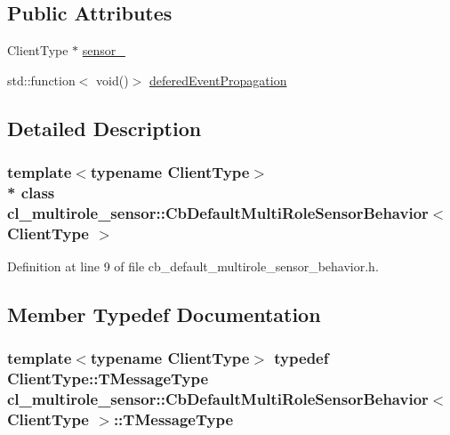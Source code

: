 \subsection*{Public Attributes}
\begin{DoxyCompactItemize}
\item 
Client\+Type $\ast$ \hyperlink{classcl__multirole__sensor_1_1CbDefaultMultiRoleSensorBehavior_a201893c3c859259eac3166405f3509cb}{sensor\+\_\+}
\item 
std\+::function$<$ void()$>$ \hyperlink{classcl__multirole__sensor_1_1CbDefaultMultiRoleSensorBehavior_a18f86fd2fd9c3575b62a2c58953b7d33}{defered\+Event\+Propagation}
\end{DoxyCompactItemize}


\subsection{Detailed Description}
\subsubsection*{template$<$typename Client\+Type$>$\\*
class cl\+\_\+multirole\+\_\+sensor\+::\+Cb\+Default\+Multi\+Role\+Sensor\+Behavior$<$ Client\+Type $>$}



Definition at line 9 of file cb\+\_\+default\+\_\+multirole\+\_\+sensor\+\_\+behavior.\+h.



\subsection{Member Typedef Documentation}
\subsubsection[{\texorpdfstring{T\+Message\+Type}{TMessageType}}]{\setlength{\rightskip}{0pt plus 5cm}template$<$typename Client\+Type$>$ typedef Client\+Type\+::\+T\+Message\+Type {\bf cl\+\_\+multirole\+\_\+sensor\+::\+Cb\+Default\+Multi\+Role\+Sensor\+Behavior}$<$ Client\+Type $>$\+::{\bf T\+Message\+Type}}\hypertarget{classcl__multirole__sensor_1_1CbDefaultMultiRoleSensorBehavior_aa23bc8c99de1eddad01d094bdab62aa4}{}\label{classcl__multirole__sensor_1_1CbDefaultMultiRoleSensorBehavior_aa23bc8c99de1eddad01d094bdab62aa4}


